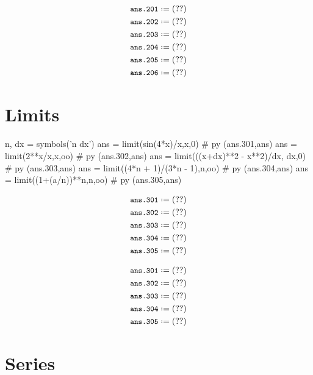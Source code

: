 \documentclass[12pt]{pylatex}
\begin{document}
\begin{align*}
   &\py*{ans.201}\\
   &\py*{ans.202}\\
   &\py*{ans.203}\\
   &\py*{ans.204}\\
   &\py*{ans.205}\\
   &\py*{ans.206}
\end{align*}

\clearpage

\section*{Limits}

\vspace{-10pt}

\begin{minipage}[t]{0.65\textwidth}
\begin{python}
   n, dx = symbols('n dx')
   ans = limit(sin(4*x)/x,x,0)                  # py (ans.301,ans)
   ans = limit(2**x/x,x,oo)                     # py (ans.302,ans)
   ans = limit(((x+dx)**2 - x**2)/dx, dx,0)     # py (ans.303,ans)
   ans = limit((4*n + 1)/(3*n - 1),n,oo)        # py (ans.304,ans)
   ans = limit((1+(a/n))**n,n,oo)               # py (ans.305,ans)
\end{python}
\end{minipage}
\hskip 1cm
\begin{minipage}[t]{0.35\textwidth}
\begin{latex}
   \begin{align*}
      &\py*{ans.301}\\
      &\py*{ans.302}\\
      &\py*{ans.303}\\
      &\py*{ans.304}\\
      &\py*{ans.305}
   \end{align*}
\end{latex}
\end{minipage}

\begin{align*}
   &\py*{ans.301}\\
   &\py*{ans.302}\\
   &\py*{ans.303}\\
   &\py*{ans.304}\\
   &\py*{ans.305}
\end{align*}

\section*{Series}
\end{document}

